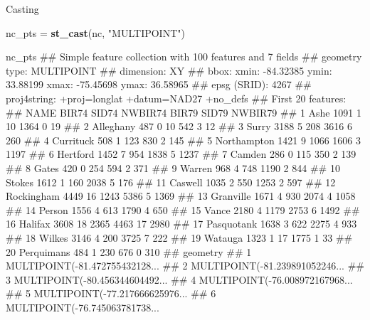 \documentclass[11pt,ignorenonframetext,]{beamer}
\newenvironment{Shaded}{}{}
\newcommand{\KeywordTok}[1]{\textcolor[rgb]{0.00,0.44,0.13}{\textbf{#1}}}
\newcommand{\StringTok}[1]{\textcolor[rgb]{0.25,0.44,0.63}{#1}}
\newcommand{\NormalTok}[1]{#1}
\let\oldShaded\Shaded
\let\endoldShaded\endShaded
\renewenvironment{Shaded}{\footnotesize\begin{spacing}{0.9}\oldShaded}{\endoldShaded\end{spacing}}
\let\oldverbatim\verbatim
\let\endoldverbatim\endverbatim
\newcommand{\scriptoutput}{
  \renewenvironment{Shaded}{\scriptsize\begin{spacing}{0.9}\oldShaded}{\endoldShaded\end{spacing}}
  \renewenvironment{verbatim}{\scriptsize\begin{spacing}{0.9}\oldverbatim}{\endoldverbatim\end{spacing}}
}
\begin{document}
\begin{frame}[fragile,t]{Casting}

\scriptoutput

\begin{Shaded}
\begin{Highlighting}[]
\NormalTok{nc_pts =}\StringTok{ }\KeywordTok{st_cast}\NormalTok{(nc, }\StringTok{"MULTIPOINT"}\NormalTok{)}

\NormalTok{nc_pts}
\NormalTok{## Simple feature collection with 100 features and 7 fields}
\NormalTok{## geometry type:  MULTIPOINT}
\NormalTok{## dimension:      XY}
\NormalTok{## bbox:           xmin: -84.32385 ymin: 33.88199 xmax: -75.45698 ymax: 36.58965}
\NormalTok{## epsg (SRID):    4267}
\NormalTok{## proj4string:    +proj=longlat +datum=NAD27 +no_defs}
\NormalTok{## First 20 features:}
\NormalTok{##           NAME BIR74 SID74 NWBIR74 BIR79 SID79 NWBIR79}
\NormalTok{## 1         Ashe  1091     1      10  1364     0      19}
\NormalTok{## 2    Alleghany   487     0      10   542     3      12}
\NormalTok{## 3        Surry  3188     5     208  3616     6     260}
\NormalTok{## 4    Currituck   508     1     123   830     2     145}
\NormalTok{## 5  Northampton  1421     9    1066  1606     3    1197}
\NormalTok{## 6     Hertford  1452     7     954  1838     5    1237}
\NormalTok{## 7       Camden   286     0     115   350     2     139}
\NormalTok{## 8        Gates   420     0     254   594     2     371}
\NormalTok{## 9       Warren   968     4     748  1190     2     844}
\NormalTok{## 10      Stokes  1612     1     160  2038     5     176}
\NormalTok{## 11     Caswell  1035     2     550  1253     2     597}
\NormalTok{## 12  Rockingham  4449    16    1243  5386     5    1369}
\NormalTok{## 13   Granville  1671     4     930  2074     4    1058}
\NormalTok{## 14      Person  1556     4     613  1790     4     650}
\NormalTok{## 15       Vance  2180     4    1179  2753     6    1492}
\NormalTok{## 16     Halifax  3608    18    2365  4463    17    2980}
\NormalTok{## 17  Pasquotank  1638     3     622  2275     4     933}
\NormalTok{## 18      Wilkes  3146     4     200  3725     7     222}
\NormalTok{## 19     Watauga  1323     1      17  1775     1      33}
\NormalTok{## 20  Perquimans   484     1     230   676     0     310}
\NormalTok{##                          geometry}
\NormalTok{## 1  MULTIPOINT(-81.472755432128...}
\NormalTok{## 2  MULTIPOINT(-81.239891052246...}
\NormalTok{## 3  MULTIPOINT(-80.456344604492...}
\NormalTok{## 4  MULTIPOINT(-76.008972167968...}
\NormalTok{## 5  MULTIPOINT(-77.217666625976...}
\NormalTok{## 6  MULTIPOINT(-76.745063781738...}

\end{Highlighting}
\end{Shaded}
\end{frame}
\end{document}
